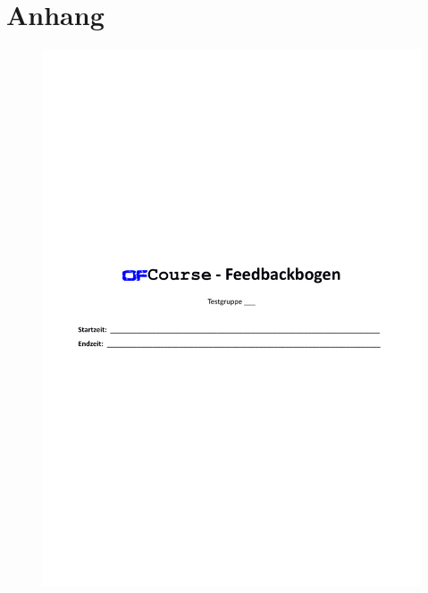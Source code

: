 \appendix
\chapter{Anhang}
\begin{figure}[h]
\centering
\includegraphics[width=0.9\linewidth, page=1]{pdf/OfCourseFeedback}
\label{fig:OfCourseFeedback}
\end{figure}
